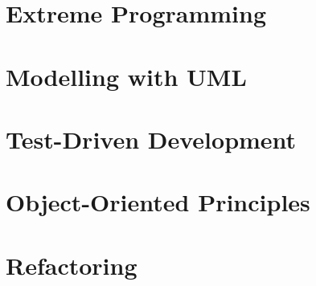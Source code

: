 \documentclass[]{UCD_CS_FYP_Report}
\begin{document}
\maketitle

\tableofcontents{}\newpage
\newpage

\chapter{Extreme Programming}


\chapter{Modelling with UML}


\chapter{Test-Driven Development}


\chapter{Object-Oriented Principles}


\chapter{Refactoring}


% 

% 

\newpage


\label{endpage}
\end{document}
